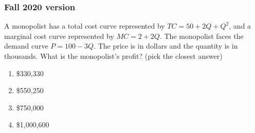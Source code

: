 \documentclass[
  12pt,
  letterpaper,
  DIV=11,
  numbers=noendperiod]{scrartcl}
\providecommand{\tightlist}{%
  \setlength{\itemsep}{0pt}\setlength{\parskip}{0pt}}
\begin{document}
\subsubsection{Fall 2020 version}\label{fall-2020-version}

\noindent A monopolist has a total cost curve represented by
\(TC=50+2Q+Q^2\), and a marginal cost curve represented by \(MC=2+2Q\).
The monopolist faces the demand curve \(P=100-3Q\). The price is in
dollars and the quantity is in thousands. What is the monopolist's
profit? (pick the closest answer)

\begin{enumerate}
\def\labelenumi{\alph{enumi})}
\tightlist
\item
  \$330,330
\item
  \$550,250
\item
  \$750,000
\item
  \$1,000,600
\end{enumerate}
\end{document}
